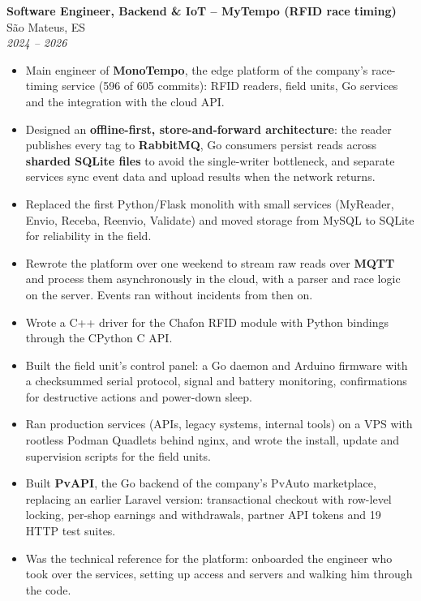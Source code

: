 \documentclass[a4paper,10pt]{article}
\begin{document}
	\textbf{Software Engineer, Backend \& IoT -- MyTempo (RFID race timing)} \hfill São Mateus, ES\\
	\textit{2024 -- 2026}
	\begin{itemize}
		\item Main engineer of \textbf{MonoTempo}, the edge platform of the company's race-timing service (596 of 605 commits): RFID readers, field units, Go services and the integration with the cloud API.
		\item Designed an \textbf{offline-first, store-and-forward architecture}: the reader publishes every tag to \textbf{RabbitMQ}, Go consumers persist reads across \textbf{sharded SQLite files} to avoid the single-writer bottleneck, and separate services sync event data and upload results when the network returns.
		\item Replaced the first Python/Flask monolith with small services (MyReader, Envio, Receba, Reenvio, Validate) and moved storage from MySQL to SQLite for reliability in the field.
		\item Rewrote the platform over one weekend to stream raw reads over \textbf{MQTT} and process them asynchronously in the cloud, with a parser and race logic on the server. Events ran without incidents from then on.
		\item Wrote a C++ driver for the Chafon RFID module with Python bindings through the CPython C API.
		\item Built the field unit's control panel: a Go daemon and Arduino firmware with a checksummed serial protocol, signal and battery monitoring, confirmations for destructive actions and power-down sleep.
		\item Ran production services (APIs, legacy systems, internal tools) on a VPS with rootless Podman Quadlets behind nginx, and wrote the install, update and supervision scripts for the field units.
		\item Built \textbf{PvAPI}, the Go backend of the company's PvAuto marketplace, replacing an earlier Laravel version: transactional checkout with row-level locking, per-shop earnings and withdrawals, partner API tokens and 19 HTTP test suites.
		\item Was the technical reference for the platform: onboarded the engineer who took over the services, setting up access and servers and walking him through the code.
	\end{itemize}
\end{document}
